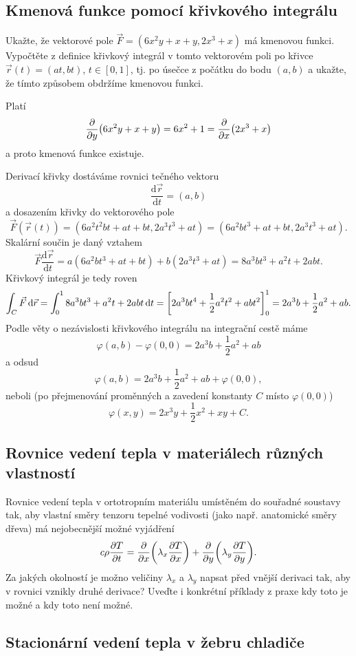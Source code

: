 \konec


\subsection{Kmenová funkce pomocí křivkového integrálu}

Ukažte, že vektorové pole
$\vec F=(6x^2y+x+y,2x^3+x)$ má kmenovou funkci. Vypočtěte z definice křivkový integrál v tomto vektorovém poli po křivce $\vec r(t)=(at,bt)$, $t\in[0,1]$, tj. po úsečce z počátku do bodu $(a,b)$ a ukažte, že tímto způsobem obdržíme kmenovou funkci.  

\reseni
Platí $$\pdv{y}\qty(6x^2y+x+y)=6x^2+1=\pdv{x}\qty(2x^3+x)$$
a proto kmenová funkce existuje.

Derivací křivky dostáváme rovnici tečného vektoru
$$\frac{\mathrm d\vec r}{\mathrm dt}=(a,b)$$
a dosazením křivky do vektorového pole
$$\vec F(\vec r(t))=(6a^2t^2bt+at+bt,2a^3t^3+at)=(6a^2bt^3+at+bt,2a^3t^3+at).$$
Skalární součin je daný vztahem
$$\vec F\frac{\mathrm d\vec r}{\mathrm dt}=a(6a^2bt^3+at+bt)+b(2a^3t^3+at)
=8a^3b t^3+a^2t+2abt.
$$
Křivkový integrál je tedy roven
$$\int_C \vec F\,\mathrm d\vec r=
\int_0^1 8a^3b t^3+a^2t+2abt\,\mathrm dt=
\qty[2a^3bt^4+\frac 12 a^2 t^2+abt^2]_0^1=2a^3b+\frac 12 a^2+ab.
$$
Podle věty o nezávislosti křivkového integrálu na integrační cestě máme
$$\varphi(a,b)-\varphi(0,0)=2a^3b+\frac 12 a^2+ab$$
a odsud
$$\varphi(a,b)=2a^3b+\frac 12 a^2+ab+\varphi(0,0),$$
neboli (po přejmenování proměnných a zavedení konstanty $C$ místo $\varphi(0,0)$)
$$\varphi(x,y)=2x^3y+\frac 12 x^2+xy+C.$$

\konec

\subsection{Rovnice vedení tepla v materiálech různých vlastností}

Rovnice vedení tepla v ortotropním materiálu umístěném do souřadné soustavy tak, aby vlastní směry tenzoru tepelné vodivosti (jako např. anatomické směry dřeva) má nejobecnější možné vyjádření
$$c\rho\pdv{T}{t}=\pdv{x}\qty(\lambda_x\pdv{T}{x} )+\pdv{y}\qty(\lambda_y\pdv{T}{y}) . $$
Za jakých okolností je možno veličiny $\lambda_x$ a $\lambda_y$ napsat před vnější derivaci tak, aby v rovnici vznikly druhé derivace? Uveďte i konkrétní příklady z praxe kdy toto je možné a kdy toto není možné.


\subsection{Stacionární vedení tepla v žebru chladiče}

